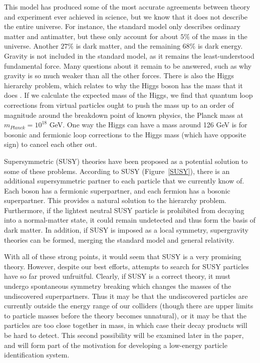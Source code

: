 \documentclass{article}
\begin{document}
This model has produced some of the most accurate agreements between theory and experiment ever achieved in science, but we know that it does not describe the entire universe. For instance, the standard model only describes ordinary matter and antimatter, but these only account for about $5\%$ of the mass in the universe. Another $27\%$ is dark matter, and the remaining $68\%$ is dark energy. Gravity is not included in the standard model, as it remains the least-understood fundamental force. Many questions about it remain to be answered, such as why gravity is so much weaker than all the other forces. There is also the Higgs hierarchy problem, which relates to why the Higgs boson has the mass that it does \cite{hierarchy}. If we calculate the expected mass of the Higgs, we find that quantum loop corrections from virtual particles ought to push the mass up to an order of magnitude around the breakdown point of known physics, the Planck mass at $m_{Planck} = 10^{18}$ GeV. One way the Higgs can have a mass around 126 GeV is for bosonic and fermionic loop corrections to the Higgs mass (which have opposite sign) to cancel each other out.

Supersymmetric (SUSY) theories have been proposed as a potential solution to some of these problems. According to SUSY (Figure~\ref{SUSY}), there is an additional supersymmetric partner to each particle that we currently know of. Each boson has a fermionic superpartner, and each fermion has a bosonic superpartner. This provides a natural solution to the hierarchy problem. Furthermore, if the lightest neutral SUSY particle is prohibited from decaying into a normal-matter state, it could remain undetected and thus form the basis of dark matter. In addition, if SUSY is imposed as a local symmetry, supergravity theories can be formed, merging the standard model and general relativity.

With all of these strong points, it would seem that SUSY is a very promising theory. However, despite our best efforts, attempts to search for SUSY particles have so far proved unfruitful. Clearly, if SUSY is a correct theory, it must undergo spontaneous symmetry breaking which changes the masses of the undiscovered superpartners. Thus it may be that the undiscovered particles are currently outside the energy range of our colliders (though there are upper limits to particle masses before the theory becomes unnatural), or it may be that the particles are too close together in mass, in which case their decay products will be hard to detect. This second possibility will be examined later in the paper, and will form part of the motivation for developing a low-energy particle identification system.
\end{document}
